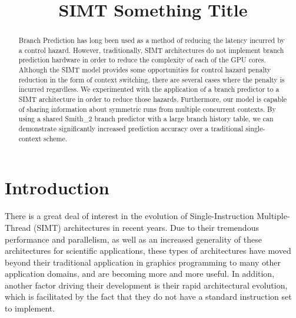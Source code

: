 \documentclass[conference]{IEEEtran}
\begin{document}
%
\title{SIMT Something Title}


\author{
\and{}
}

\maketitle

\begin{abstract} 

Branch Prediction has long been used as a method of reducing the latency incurred by a control hazard.  However, traditionally, SIMT architectures 
do not implement branch prediction hardware in order to reduce the complexity of each of the GPU cores.  Although the SIMT model provides some 
opportunities for control hazard penalty reduction in the form of context switching, there are several cases where the penalty is incurred regardless.
We experimented with the application of a branch predictor to a SIMT architecture in order to reduce those hazards.  Furthermore, our model is 
capable of sharing information about symmetric runs from multiple concurrent contexts.  By using a shared Smith\_2 branch predictor \cite{smith} with a large branch history table,
we can demonstrate significantly increased prediction accuracy over a traditional single-context scheme.

\end{abstract}

\IEEEpeerreviewmaketitle


\section{Introduction}
There is a great deal of interest in the evolution of Single-Instruction Multiple-Thread (SIMT) architectures in recent years.  Due to
their tremendous performance and parallelism, as well as an increased generality of these architectures for scientific applications, these 
types of architectures have moved beyond their traditional application in graphics programming to many other application domains, and are becoming more and more useful.
In addition, another factor driving their development is their rapid architectural evolution, which is facilitated by the fact that they do not have a standard instruction set
to implement.  
\end{document}
